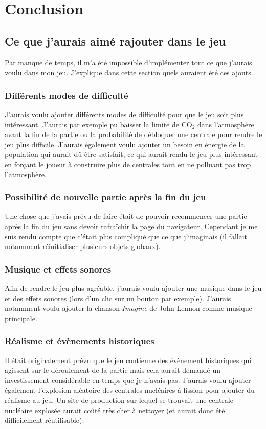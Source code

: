 \documentclass{article}
\begin{document}
        \section{Conclusion}
        \subsection{Ce que j'aurais aimé rajouter dans le jeu} \label{ajoutJeu}
		Par manque de temps, il m'a été impossible d'implémenter tout ce que j'aurais voulu dans mon jeu. J'explique dans cette section quels auraient été ces ajouts.
		
		\subsubsection{Différents modes de difficulté}
		J'aurais voulu ajouter différents modes de difficulté pour que le jeu soit plus intéressant. J'aurais par exemple pu baisser la limite de CO$_{2}$ dans l'atmosphère avant la fin de la partie ou la probabilité de débloquer une centrale pour rendre le jeu plus difficile. J'aurais également voulu ajouter un besoin en énergie de la population qui aurait dû être satisfait, ce qui aurait rendu le jeu plus intéressant en forçant le joueur à construire plus de centrales tout en ne polluant pas trop l'atmosphère.
		
		\subsubsection{Possibilité de nouvelle partie après la fin du jeu}
		Une chose que j'avais prévu de faire était de pouvoir recommencer une partie après la fin du jeu sans devoir rafraîchir la page du navigateur. Cependant je me suis rendu compte que c'était plus compliqué que ce que j'imaginais (il fallait notamment réinitialiser plusieurs objets globaux).		
		
		\subsubsection{Musique et effets sonores}
		Afin de rendre le jeu plus agréable, j'aurais voulu ajouter une musique dans le jeu et des effets sonores (lors d'un clic sur un bouton par exemple). J'aurais notamment voulu ajouter la chanson \textit{Imagine} de John Lennon comme musique principale. 
		
		\subsubsection{Réalisme et évènements historiques}
		Il était originalement prévu que le jeu contienne des évènement historiques qui agissent sur le déroulement de la partie mais cela aurait demandé un investissement considérable en temps que je n'avais pas.
		J'aurais voulu ajouter également l'explosion aléatoire des centrales nucléaires à fission pour ajouter du réalisme au jeu. Un site de production sur lequel se trouvait une centrale nucléaire explosée aurait coûté très cher à nettoyer (et aurait donc été difficilement réutilisable).
		
\end{document}
